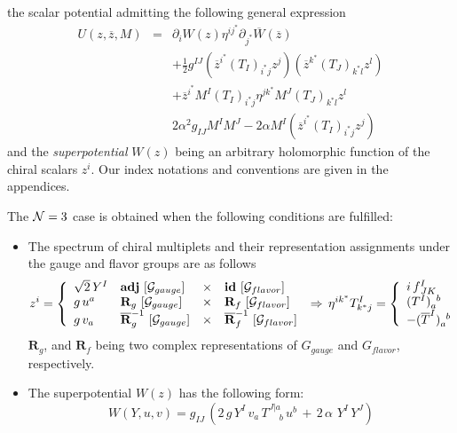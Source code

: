 \documentclass[a4paper,12pt]{article}
\newcommand{\ft}[2]{{\textstyle\frac{#1}{#2}}}
\begin{document}
the scalar potential admitting the following general expression
\begin{eqnarray}
U(z,\overline z,M)&=&
\partial_i W(z)\eta^{ij^*}\partial_{j^*}\overline W(\overline z)\nonumber\\
&&+\ft{1}{2}g^{IJ}\left(\overline z^{i^*}(T_I)_{i^*j}z^j\right)
\left(\overline z^{k^*}(T_J)_{k^*l}z^l\right)\nonumber\\
&&+\overline z^{i^*}M^I(T_I)_{i^*j}\eta^{jk^*}M^J(T_J)_{k^*l}
z^l\nonumber\\
&&2\alpha^2g_{IJ}M^IM^J
  -2\alpha M^I\left(\overline z^{i^*}(T_I)_{i^*j}z^j\right)
  \label{scalapote}
\end{eqnarray}
and the {\it superpotential} $W(z)$ being an arbitrary holomorphic
function of the chiral scalars $z^i$. Our index notations
and conventions are given in the appendices.
\par
The ${\cal N}=3$ case is obtained when the  following conditions
are fulfilled:
\begin{itemize}
  \item The spectrum of chiral multiplets and their representation assignments
   under the gauge and flavor groups are as follows
  \begin{equation}
  z^i=\left\{\begin{array}{l lcl}
    \sqrt{2} \,Y^I & \mbox{\bf adj} \, \left[\mathcal{G}_{gauge}\right]
    & \times & \mbox{\bf id} \,
    \left[\mathcal{G}_{flavor}\right]\\
    g\,u^a & \mathbf{R}_g \, \left[\mathcal{G}_{gauge} \right] &
    \times & \mathbf{R}_f  \,\left[ \mathcal{G}_{flavor}\right]\\
    g\,v_a & \overline{{\mathbf{R}}}^{-1}_g \,
    \left[\mathcal{G}_{gauge} \right] & \times &
    \overline{{\mathbf{R}}}_f^{-1} \,\left[ \mathcal{G}_{flavor}\right]
  \end{array}\right. \, \Rightarrow \,
  \eta^{ik^*}T^I_{k^*j}=\left\{\begin{array}{l}
    i \, f^I_{\,JK}\\
    (T^I)_{a}^{\phantom{a}b}\\
    -(\overline T^I)_{a}^{\phantom{a}b}
  \end{array}\right.
  \label{istcond}
  \end{equation}
  $\mathbf{R}_g$, and $\mathbf{R}_f$ being two complex representations
  of $G_{gauge}$ and $G_{flavor}$, respectively.
  \item The superpotential $W(z)$ has the following form:
  \begin{equation}
  W(Y,u,v)=g_{IJ}\,\left(2\,g\,Y^I\,v_a\,T^{J\vert a}_{\quad\ b}\,
  u^b\,+\,2\,\alpha\,\,Y^I\,Y^J\right)
  \label{suppotn3}
  \end{equation}
\end{itemize}
\end{document}

